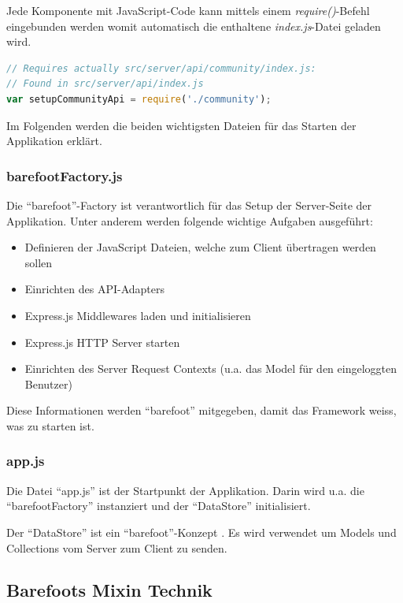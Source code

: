 Jede Komponente mit JavaScript-Code kann mittels einem \emph{require()}-Befehl eingebunden werden womit automatisch die enthaltene \emph{index.js}-Datei geladen wird.

\newpage
\begin{lstlisting}[language=JavaScript, caption=Einbindung der Community-Komponente]
// Requires actually src/server/api/community/index.js:
// Found in src/server/api/index.js
var setupCommunityApi = require('./community');
\end{lstlisting}

Im Folgenden werden die beiden wichtigsten Dateien für das Starten der Applikation erklärt.

\subsubsection*{barefootFactory.js}
Die ``barefoot''-Factory \cite{barefootFactoryjs} ist verantwortlich für das Setup der Server-Seite der Applikation.
Unter anderem werden folgende wichtige Aufgaben ausgeführt:
\begin{itemize}
	\item Definieren der JavaScript Dateien, welche zum Client übertragen werden sollen
	\item Einrichten des API-Adapters
	\item Express.js \cite{Expressjs} Middlewares laden und initialisieren
	\item Express.js \cite{Expressjs} HTTP Server starten
	\item Einrichten des Server Request Contexts (u.a. das Model für den eingeloggten Benutzer)
\end{itemize}

Diese Informationen werden ``barefoot'' \cite{Barefoot} mitgegeben, damit das Framework weiss, was zu starten ist.

\subsubsection*{app.js}
Die Datei ``app.js'' \cite{appjs} ist der Startpunkt der Applikation.
Darin wird u.a. die ``barefootFactory'' instanziert und der ``DataStore'' initialisiert.

Der ``DataStore'' ist ein ``barefoot''-Konzept \cite{barefootDatastore}. Es wird verwendet um Models und Collections vom Server zum Client zu senden.

\newpage
\subsection{Barefoots Mixin Technik}

